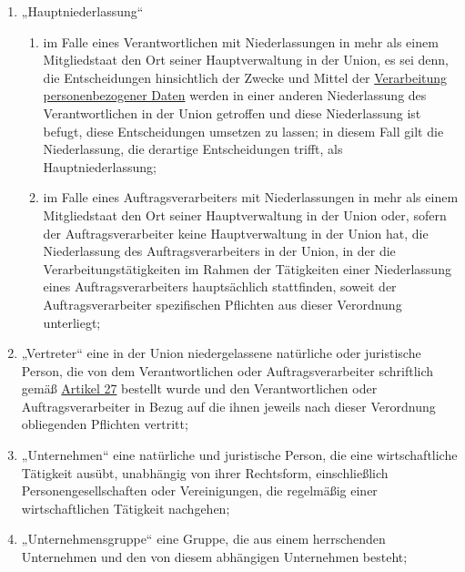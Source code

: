\begin{enumerate}
  \item „Hauptniederlassung“
  \label{itm:04-16}

  \begin{enumerate}
  
    \item im Falle eines Verantwortlichen mit Niederlassungen in mehr als einem Mitgliedstaat den Ort seiner
     Hauptverwaltung in der Union, es sei denn, die Entscheidungen hinsichtlich der Zwecke und Mittel der \hyperref[itm:04-2]{Verarbeitung}
     \hyperref[itm:04-1]{personenbezogener Daten} werden in einer anderen Niederlassung des Verantwortlichen in der Union getroffen und
     diese Niederlassung ist befugt, diese Entscheidungen umsetzen zu lassen; in diesem Fall gilt die Niederlassung,
     die derartige Entscheidungen trifft, als Hauptniederlassung;
    \label{itm:04-16a}

    \item im Falle eines Auftragsverarbeiters mit Niederlassungen in mehr als einem Mitgliedstaat den Ort seiner
     Hauptverwaltung in der Union oder, sofern der Auftragsverarbeiter keine Hauptverwaltung in der Union hat, die
     Niederlassung des Auftragsverarbeiters in der Union, in der die Verarbeitungstätigkeiten im Rahmen der Tätigkeiten
     einer Niederlassung eines Auftragsverarbeiters hauptsächlich stattfinden, soweit der Auftragsverarbeiter
     spezifischen Pflichten aus dieser Verordnung unterliegt;
    \label{itm:04-16b}

  \end{enumerate}

  \item „Vertreter“ eine in der Union niedergelassene natürliche oder juristische Person, die von dem Verantwortlichen
   oder Auftragsverarbeiter schriftlich gemäß \hyperref[ch:27]{Artikel 27} bestellt wurde und den Verantwortlichen oder
   Auftragsverarbeiter in Bezug auf die ihnen jeweils nach dieser Verordnung obliegenden Pflichten vertritt;
  \label{itm:04-17}

  \item „Unternehmen“ eine natürliche und juristische Person, die eine wirtschaftliche Tätigkeit ausübt, unabhängig von
   ihrer Rechtsform, einschließlich Personengesellschaften oder Vereinigungen, die regelmäßig einer wirtschaftlichen
   Tätigkeit nachgehen;
  \label{itm:04-18}

  \item „Unternehmensgruppe“ eine Gruppe, die aus einem herrschenden Unternehmen und den von diesem abhängigen
   Unternehmen besteht;
  \label{itm:04-19}


\end{enumerate}
